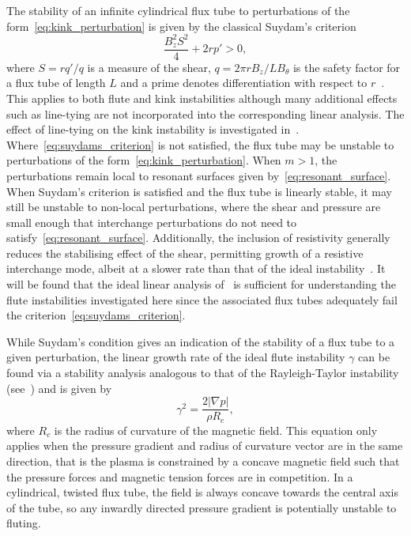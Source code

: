 \documentclass[fleqn,usenatbib]{mnras}
\newcommand{\rs}[2]{{#2}}
\begin{document}
The stability of an infinite cylindrical flux tube to perturbations of
the form~\eqref{eq:kink_perturbation} is given by the classical
\rs{}{Suydam's criterion \citep{suydamStabilityLinearPinch1958}}
\begin{equation}
  \label{eq:suydams_criterion}
\frac{B_z^2 S^2}{4} + 2 r p' > 0,
\end{equation}
where $S = r q'/q$ is a measure of the shear, $q = 2\pi r B_z / L
B_{\theta}$ is the safety factor for a flux tube of length $L$ and a
\rs{dash}{prime} denotes differentiation with respect to
$r$~\citep{mikhailovskiiInstabilitiesConfinedPlasma1998}. This applies
to both \rs{fluting}{flute} and kink instabilities although many
additional effects such as line-tying are not incorporated into the
corresponding linear analysis. The effect of line-tying on the kink
instability \rs{can be found}{is investigated}
in~\citep{hoodKinkInstabilitySolar1979}. Where~\eqref{eq:suydams_criterion}
is not satisfied, the flux tube may be unstable to perturbations of
the form~\eqref{eq:kink_perturbation}. When $m>1$, the perturbations
remain local to resonant surfaces given
by~\eqref{eq:resonant_surface}. 
\rs{}{When} Suydam's criterion is satisfied and the flux tube is linearly stable, it may still be unstable to non-local perturbations, where the shear and pressure are small enough that interchange perturbations do not need to satisfy~\eqref{eq:resonant_surface}. Additionally, the inclusion of resistivity generally reduces the stabilising effect of the shear, permitting growth of a resistive interchange mode, albeit at a slower rate than that of the ideal instability~\citep{mikhailovskiiInstabilitiesConfinedPlasma1998}. It will be found that the ideal linear analysis of~\cite{mikhailovskiiInstabilitiesConfinedPlasma1998} is sufficient for understanding the \rs{fluting}{flute} instabilities investigated here since the associated flux tubes adequately fail the criterion~\eqref{eq:suydams_criterion}.

While Suydam's condition gives an indication of the stability of a flux tube to a given perturbation, the linear growth rate of the ideal \rs{fluting}{flute} instability $\gamma$ can be found via a stability analysis analogous to that of the Rayleigh-Taylor instability (see~\citep{goldstonIntroductionPlasmaPhysics2020}) and is given by
\begin{equation}
  \label{eq:fluting_growth_rate}
\gamma^2 = \frac{2|\nabla p|}{\rho R_c},
\end{equation}
where $R_c$ is the radius of curvature of the magnetic field. This equation only applies when the pressure gradient and radius of curvature vector are in the same direction, that is the plasma is constrained by a concave magnetic field such that the pressure forces and magnetic tension forces are in competition. In a cylindrical, twisted flux tube, the field is always concave towards the central axis of the tube, so any inwardly directed pressure gradient is potentially unstable to fluting.
\end{document}
